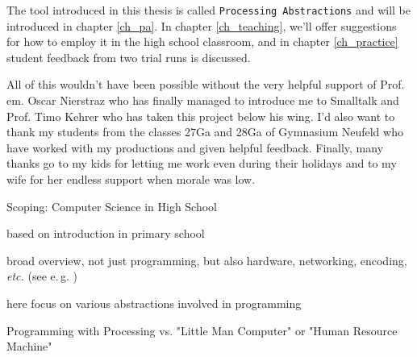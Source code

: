 The tool introduced in this thesis is called \texttt{Processing Abstractions} and will be introduced in chapter \ref{ch_pa}. In chapter \ref{ch_teaching}, we'll offer suggestions for how to employ it in the high school classroom, and in chapter \ref{ch_practice} student feedback from two trial runs is discussed.

All of this wouldn't have been possible without the very helpful support of Prof.\,em. Oscar Nierstraz who has finally managed to introduce me to Smalltalk and Prof. Timo Kehrer who has taken this project below his wing. I'd also want to thank my students from the classes 27Ga and 28Ga of Gymnasium Neufeld who have worked with my productions and given helpful feedback. Finally, many thanks go to my kids for letting me work even during their holidays and to my wife for her endless support when morale was low.


\begin{todo}
\item Scoping: Computer Science in High School
\item based on introduction in primary school
\item broad overview, not just programming, but also hardware, networking, encoding, \emph{etc.} (see e.\,g. \cite{Erz16})
\item here focus on various abstractions involved in programming
\item Programming with Processing vs. "Little Man Computer" or "Human Resource Machine"
\end{todo}
